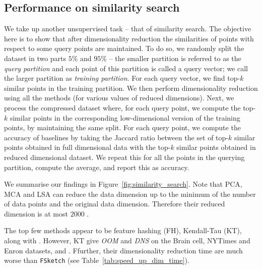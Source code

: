 \subsection{Performance on similarity search}
We take up another unsupervised task -- that of similarity search. The objective here is to show that after dimensionality reduction the similarities of points with respect to some query points are maintained. To do so, we randomly split the dataset in two parts $5\%$ and $95\%$  -- the smaller partition is referred to as the \textit{query partition} and each point of this partition is called a query vector; we call the larger partition as \textit{training partition}. For each query vector, we find top-$k$ similar points in the training partition. We then perform dimensionality reduction using all the methods (for various values of reduced dimensions). Next, we process the compressed dataset where, for each query point, we compute the  top-$k$ similar points in the corresponding low-dimensional version of the training points, by maintaining the same split. For each query point, we compute the accuracy of baselines by taking the Jaccard ratio between the set of top-$k$ similar points obtained in full dimensional data with  the top-$k$ similar points obtained in reduced dimensional dataset. We repeat this for all the points in the querying partition, compute the average, and report this as accuracy.%

We summarise our findings in Figure~\ref{fig:similarity_search}. Note that PCA, MCA and LSA can reduce the data dimension up to the minimum of the number of data points and the original data dimension. Therefore their reduced dimension is at most $2000$ .

The top few methods appear to be feature hashing (FH), Kendall-Tau (KT),  along with \fsketch. However, KT give \textit{OOM} and \textit{DNS} on the Brain cell, NYTimes and Enron datasets, and .  Ffurther, their dimensionality reduction time are much worse than \texttt{FSketch} (see Table~\ref{tab:speed_up_dim_time}). 


